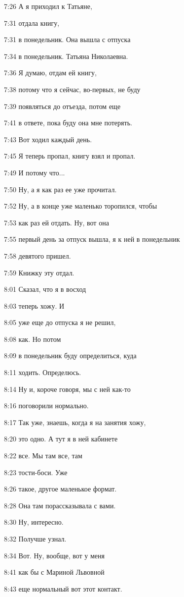 7:26
А я приходил к Татьяне,

7:31
отдала книгу,

7:31
в понедельник. Она вышла с отпуска

7:34
в понедельник. Татьяна Николаевна.

7:36
Я думаю, отдам ей книгу,

7:38
потому что я сейчас, во-первых, не буду

7:39
появляться до отъезда, потом еще

7:41
в ответе, пока буду она мне потерять.

7:43
Вот ходил каждый день.

7:45
Я теперь пропал, книгу взял и пропал.

7:49
И потому что...

7:50
Ну, а я как раз ее уже прочитал.

7:52
Ну, а в конце уже маленько торопился, чтобы

7:53
как раз ей отдать. Ну, вот она

7:55
первый день за отпуск вышла, я к ней в понедельник

7:58
девятого пришел.

7:59
Книжку эту отдал.

8:01
Сказал, что я в восход

8:03
теперь хожу. И

8:05
уже еще до отпуска я не решил,

8:08
как. Но потом

8:09
в понедельник буду определиться, куда

8:11
ходить. Определюсь.

8:14
Ну и, короче говоря, мы с ней как-то

8:16
поговорили нормально.

8:17
Так уже, знаешь, когда я на занятия хожу,

8:20
это одно. А тут я в ней кабинете

8:22
все. Мы там все, там

8:23
тости-боси. Уже

8:26
такое, другое маленькое формат.

8:28
Она там порассказывала с вами.

8:30
Ну, интересно.

8:32
Получше узнал.

8:34
Вот. Ну, вообще, вот у меня

8:41
как бы с Мариной Львовной

8:43
еще нормальный вот этот контакт.

